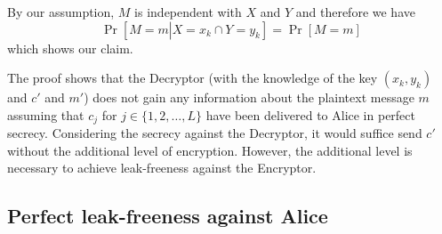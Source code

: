 \documentclass[10pt,journal]{IEEEtran}
\newcommand{\rv}[1]{{#1}}
\begin{document}
\begin{IEEEproof}
By our assumption, $M$ is independent with $\rv{X}$ and $\rv{Y}$ and therefore we have
\[
\Pr \left[ M = m \left| \rv{X} = x_{k} \cap \rv{Y} = y_{k} \right. \right] = \Pr \left[ M = m \right]
\]
which shows our claim.
\end{IEEEproof}


The proof shows that the Decryptor (with the knowledge of the key $(x_k,y_k)$ and $c'$ and $m'$)
does not gain any information
about the plaintext message $m$
assuming that
$c_j$ for $j \in \{1,2,\ldots,L\}$ have been delivered to Alice in perfect secrecy.
Considering the secrecy against the Decryptor, it would suffice send $c'$
without the additional level of encryption.
However, the additional level is necessary
to achieve leak-freeness against the Encryptor.


\subsection{Perfect leak-freeness against Alice}
\end{document}
